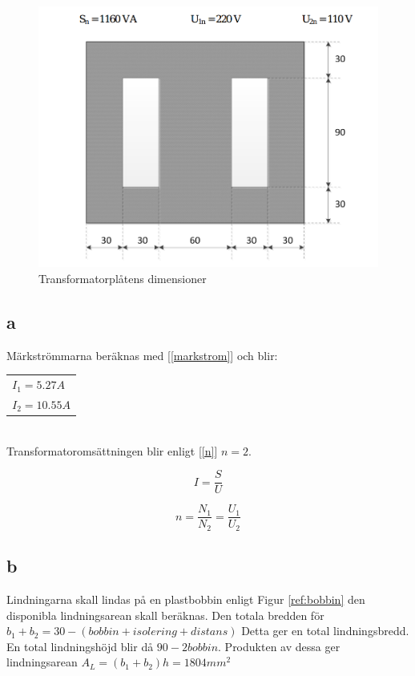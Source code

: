 \documentclass{article}
\begin{document}
 \begin{figure}[H]
 \begin{center}
 \includegraphics[width=1\textwidth]{img/transformatorplat.png} %
 \caption{Transformatorplåtens dimensioner}
 \label{fig:trafo}
 \end{center}
 \end{figure}

\subsection{a}
Märkströmmarna beräknas med [\ref{markstrom}] och blir:
\begin{tabular}{|l}
  $I_1=5.27 A$\\
  $I_2=10.55 A$\\
\end{tabular}
\\
Transformatoromsättningen blir enligt [\ref{n}] $n=2$.

\begin{equation}
  I=\frac{S}{U}
  \label{markstrom}
\end{equation}

\begin{equation}
  n=\frac{N_1}{N_2}=\frac{U_1}{U_2}
  \label{n}
\end{equation}

\subsection{b}
Lindningarna skall lindas på en plastbobbin enligt Figur \ref{ref:bobbin} den disponibla lindningsarean skall beräknas.
Den totala bredden för $b_1+b_2=30-(bobbin+isolering+distans)$ Detta ger en total lindningsbredd.
En total lindningshöjd blir då $90-2bobbin$.
Produkten av dessa ger lindningsarean $A_L=(b_1+b_2)h=1804 mm^2$
\end{document}
